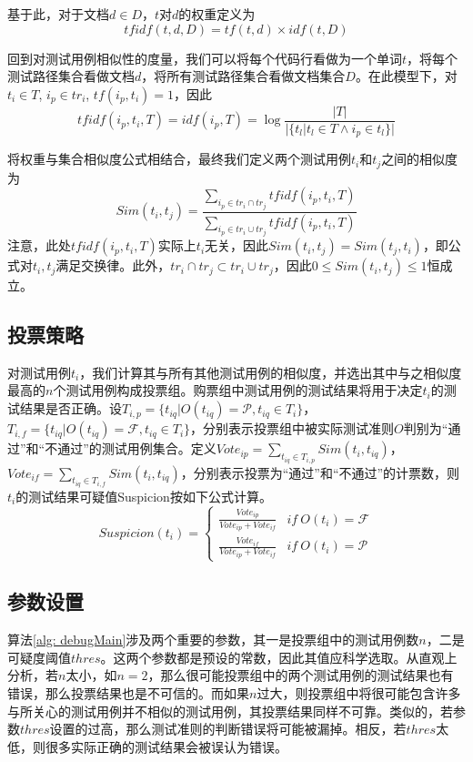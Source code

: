基于此，对于文档$d \in D$，$t$对$d$的权重定义为
$$tfidf(t, d, D) = tf(t, d) \times idf(t, D)
$$

回到对测试用例相似性的度量，我们可以将每个代码行看做为一个单词$t$，将每个测试路径集合看做文档$d$，将所有测试路径集合看做文档集合$D$。在此模型下，对$t_i \in T$, $i_p \in tr_i$, $tf(i_p, t_i) = 1$，因此
$$
tfidf(i_p, t_i, T) = idf(i_p, T) = \log{\frac{|T|}{|\{t_l|t_l \in T \wedge i_p \in t_l\}|}}
$$

将权重与集合相似度公式相结合，最终我们定义两个测试用例$t_i$和$t_j$之间的相似度为
$$
Sim (t_i, t_j) = \frac{\sum_{i_p \in {tr}_i \cap {tr}_j}^{} tfidf(i_p, t_i, T)}{\sum_{i_p \in {tr}_i \cup {tr}_j}^{} tfidf(i_p, t_i, T)}
$$
注意，此处$tfidf(i_p, t_i, T)$实际上$t_i$无关，因此$Sim(t_i, t_j) = Sim(t_j, t_i)$，即公式对$t_i,t_j$满足交换律。此外，${tr}_i \cap {tr}_j \subset {tr}_i \cup {tr}_j$，因此$0 \le Sim(t_i, t_j) \le 1$恒成立。

\subsection{投票策略}
对测试用例$t_i$，我们计算其与所有其他测试用例的相似度，并选出其中与之相似度最高的$n$个测试用例构成投票组。购票组中测试用例的测试结果将用于决定$t_i$的测试结果是否正确。设$T_{i, p} = \{t_{iq} | O(t_{iq}) = \mathcal{P}, t_{iq}\in T_i\}$， $T_{i, f} = \{t_{iq} | O(t_{iq}) = \mathcal{F}, t_{iq}\in T_i\}$，分别表示投票组中被实际测试准则$O$判别为“通过”和“不通过”的测试用例集合。定义$Vote_{ip} = \sum_{t_{iq} \in T_{i, p}} Sim(t_i, t_{iq})$，$Vote_{if} = \sum_{t_{iq} \in T_{i, f}} Sim(t_i, t_{iq})$，分别表示投票为“通过”和“不通过”的计票数，则$t_i$的测试结果可疑值Suspicion按如下公式计算。
$$
Suspicion(t_i) = \left\{
\begin{array}{lr}
\frac {Vote_{ip}}{Vote_{ip} + Vote_{if}}     & if \ O(t_i) = \mathcal{F} \\
\frac {Vote_{if}}{Vote_{ip} + Vote_{if}}     & if \ O(t_i) = \mathcal{P}
\end{array}
\right.
$$

\subsection{参数设置}
\label{subsection: param}

算法\ref{alg: debugMain}涉及两个重要的参数，其一是投票组中的测试用例数$n$，二是可疑度阈值$thres$。这两个参数都是预设的常数，因此其值应科学选取。从直观上分析，若$n$太小，如$n = 2$，那么很可能投票组中的两个测试用例的测试结果也有错误，那么投票结果也是不可信的。而如果$n$过大，则投票组中将很可能包含许多与所关心的测试用例并不相似的测试用例，其投票结果同样不可靠。类似的，若参数$thres$设置的过高，那么测试准则的判断错误将可能被漏掉。相反，若$thres$太低，则很多实际正确的测试结果会被误认为错误。

